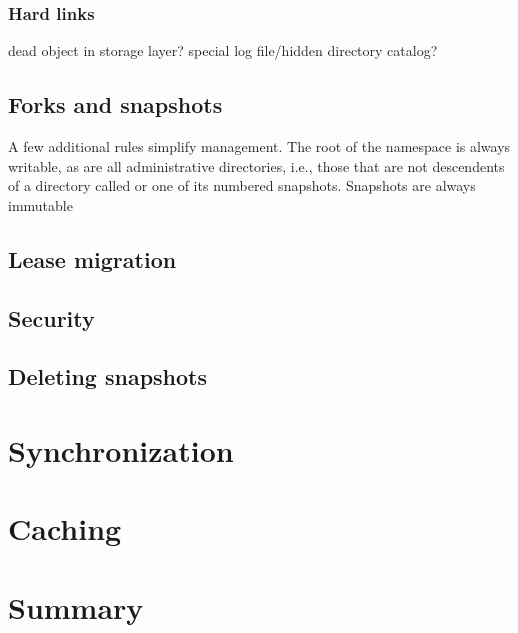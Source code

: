 \subsubsection{Hard links}\label{sec:hard-links}
dead object in storage layer? special log file/hidden directory catalog?

\subsection{Forks and snapshots}

A few additional rules simplify management. The root of the namespace is always writable, as are all administrative directories, i.e., those that are not descendents of a directory called \current or one of its numbered snapshots. Snapshots are always immutable

\subsection{Lease migration}
\subsection{Security}
\subsection{Deleting snapshots}


\section{Synchronization}
\section{Caching}

\section{Summary}